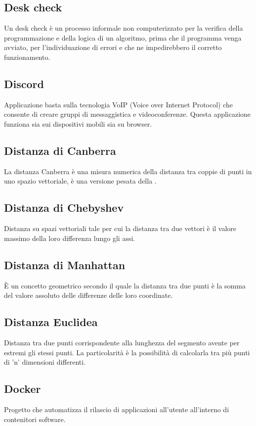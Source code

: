 \subsection*{Desk check}
Un desk check è un processo informale non computerizzato per la verifica della programmazione e della logica di un algoritmo, prima che il programma venga avviato, per l'individuazione di errori e  che ne impedirebbero il corretto funzionamento.

\subsection*{Discord}
Applicazione  basta sulla tecnologia VoIP (Voice over Internet Protocol) che consente di creare gruppi di messaggistica e videoconferenze. Questa applicazione funziona sia sui dispositivi mobili sia su browser.

\subsection*{Distanza di Canberra}
La distanza Canberra è una misura numerica della distanza tra coppie di punti in uno spazio vettoriale, è una versione pesata della .

\subsection*{Distanza di Chebyshev}
Distanza su spazi vettoriali tale per cui la distanza tra due vettori è il valore massimo della loro differenza lungo gli assi.

\subsection*{Distanza di Manhattan}
È un concetto geometrico secondo il quale la distanza tra due punti è la somma del valore assoluto delle differenze delle loro coordinate.

\subsection*{Distanza Euclidea}
Distanza tra due punti corrispondente alla lunghezza del segmento avente per estremi gli stessi punti. La particolarità è la possibilità di calcolarla tra più punti di 'n' dimensioni differenti.

\subsection*{Docker}
Progetto  che automatizza il rilascio di applicazioni all'utente all'interno di contenitori software.


